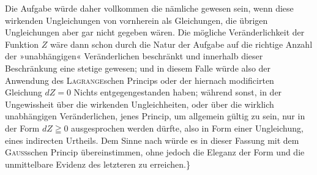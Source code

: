\indent Die Aufgabe würde daher vollkommen die nämliche gewesen sein, wenn diese wirkenden Ungleichungen von vornherein als Gleichungen, die übrigen Ungleichungen aber gar nicht gegeben wären. Die mögliche Veränderlichkeit der Funktion \(Z\) wäre dann schon durch die Natur der Aufgabe auf die richtige Anzahl der »unabhängigen« Veränderlichen beschränkt und innerhalb dieser Beschränkung eine stetige gewesen; und in diesem Falle würde also der Anwendung des \textsc{Lagrange}schen Princips oder der hiernach modificirten Gleichung \(dZ=0\) Nichts entgegengestanden haben; während sonst, in der Ungewissheit über die wirkenden Ungleichheiten, oder über die wirklich unabhängigen Veränderlichen, jenes Princip, um allgemein gültig zu sein, nur in der Form \(dZ\geqq 0\) ausgesprochen werden dürfte, also in Form einer Ungleichung, eines indirecten Urtheils. Dem Sinne nach würde es in dieser Fassung mit dem \textsc{Gauss}schen Princip übereinstimmen, ohne jedoch die Eleganz der Form und die unmittelbare Evidenz des letzteren zu erreichen.\}
\ClosingRule
